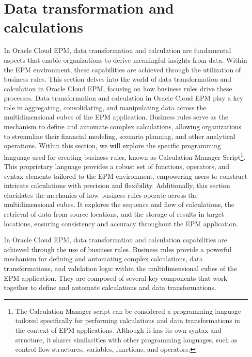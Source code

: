 \documentclass[12pt,a4paper,openright,twoside]{book}
\begin{document}
\section{Data transformation and calculations}

In Oracle Cloud EPM, data transformation and calculation are fundamental aspects that enable organizations to derive meaningful insights from data. 
%
Within the EPM environment, these capabilities are achieved through the utilization of business rules.
%
This section delves into the world of data transformation and calculation in Oracle Cloud EPM, focusing on how business rules drive these processes.
%
Data transformation and calculation in Oracle Cloud EPM play a key role in aggregating, consolidating, and manipulating data across the multidimensional cubes of the EPM application.
%
Business rules serve as the mechanism to define and automate complex calculations, allowing organizations to streamline their financial modeling, scenario planning, and other analytical operations.
%
Within this section, we will explore the specific programming language used for creating business rules, known as Calculation Manager Script\footnote{The Calculation Manager script can be considered a programming language tailored specifically for performing calculations and data transformations in the context of EPM applications. Although it has its own syntax and structure, it shares similarities with other programming languages, such as control flow structures, variables, functions, and operators.}. 
%
This proprietary language provides a robust set of functions, operators, and syntax elements tailored to the EPM environment, empowering users to construct intricate calculations with precision and flexibility.
%
Additionally, this section elucidates the mechanics of how business rules operate across the multidimensional cubes. 
%
It explores the sequence and flow of calculations, the retrieval of data from source locations, and the storage of results in target locations, ensuring consistency and accuracy throughout the EPM application.

In Oracle Cloud EPM, data transformation and calculation capabilities are achieved through the use of business rules. 
%
Business rules provide a powerful mechanism for defining and automating complex calculations, data transformations, and validation logic within the multidimensional cubes of the EPM application.
%
They are composed of several key components that work together to define and automate calculations and data transformations. 
\end{document}
